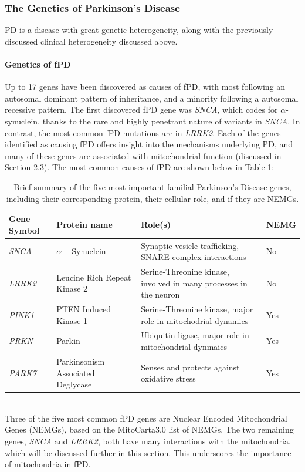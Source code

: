 \documentclass{article}
\begin{document}
\subsubsection{The Genetics of Parkinson’s Disease}
PD is a disease with great genetic heterogeneity, along with the previously discussed clinical heterogeneity discussed above. 
\paragraph{Genetics of fPD}Up to 17 genes have been discovered as causes of fPD\cite{Day2021ThePractice}, with most following an autosomal dominant pattern of inheritance, and a minority following a autosomal recessive pattern. The first discovered fPD gene was \textit{SNCA}, which codes for $\alpha$-synuclein, thanks to the rare and highly penetrant nature of variants in \textit{SNCA}. In contrast, the most common fPD mutations are in \textit{LRRK2}\cite{Klein2012GeneticsDisease}. Each of the genes identified as causing fPD offers insight into the mechanisms underlying PD, and many of these genes are associated with mitochondrial function (discussed in Section \hyperref[subsec:mitochondria]{2.3}). The most common causes of fPD are shown below in Table 1:
\begin{table}[h]
    \label{tab:fPDgenes}
    \centering
    \caption{Brief summary of the five most important familial Parkinson's Disease genes, including their corresponding protein, their cellular role, and if they are NEMGs.}
    \begin{tabular}{|p{2.5cm}|p{4cm}|p{6cm}|p{1.5cm}|}
        \hline
        Gene Symbol & Protein name & Role(s) & NEMG \\ \hline
        \textit{SNCA} & $\alpha-$Synuclein & Synaptic vesicle trafficking, SNARE complex interactions & No \\ \hline
        \textit{LRRK2} & Leucine Rich Repeat Kinase 2 & Serine-Threonine kinase, involved in many processes in the neuron & No \\ \hline
        \textit{PINK1} & PTEN Induced Kinase 1 & Serine-Threonine kinase, major role in mitochodrial dynamics & Yes\\ \hline
        \textit{PRKN} & Parkin & Ubiquitin ligase, major role in mitochondrial dynmaics & Yes\\ \hline
        \textit{PARK7} & Parkinsonism Associated Deglycase & Senses and protects against oxidative stress & Yes\\ \hline
    \end{tabular}
\end{table}
\\Three of the five most common fPD genes are Nuclear Encoded Mitochondrial Genes (NEMGs), based on the MitoCarta3.0\cite{Rath2021MitoCarta3.0:Annotations} list of NEMGs. The two remaining genes, \textit{SNCA} and \textit{LRRK2}, both have many interactions with the mitochondria, which will be discussed further in this section. This underscores the importance of mitochondria in fPD.
\end{document}
